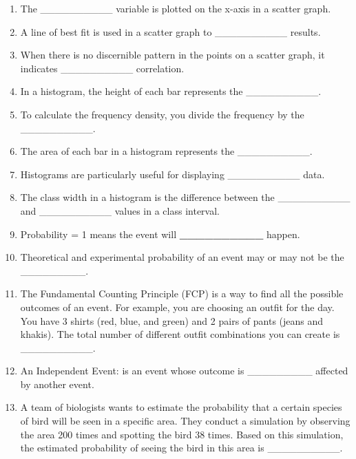 \documentclass{article}
\begin{document}
\begin{enumerate}
    \item The \_\_\_\_\_\_\_\_\_\_ variable is plotted on the x-axis in a scatter graph.
    \item A line of best fit is used in a scatter graph to \_\_\_\_\_\_\_\_\_\_ results.
    \item When there is no discernible pattern in the points on a scatter graph, it indicates \_\_\_\_\_\_\_\_\_\_ correlation.
    \item In a histogram, the height of each bar represents the \_\_\_\_\_\_\_\_\_\_.
    \item To calculate the frequency density, you divide the frequency by the \_\_\_\_\_\_\_\_\_\_.
    \item The area of each bar in a histogram represents the \_\_\_\_\_\_\_\_\_\_.
    \item Histograms are particularly useful for displaying \_\_\_\_\_\_\_\_\_\_ data.
    \item The class width in a histogram is the difference between the \_\_\_\_\_\_\_\_\_\_ and \_\_\_\_\_\_\_\_\_\_ values in a class interval.
    \item Probability = 1 means the event will \textbf{\_\_\_\_\_\_\_\_\_\_} happen.
    \item Theoretical and experimental probability of an event may or may not be the \_\_\_\_\_\_\_\_\_.
    \item The Fundamental Counting Principle (FCP) is a way to find all the possible outcomes of an event. For example, you are choosing an outfit for the day. You have 3 shirts (red, blue, and green) and 2 pairs of pants (jeans and khakis). The total number of different outfit combinations you can create is \_\_\_\_\_\_\_\_\_\_.
    \item An Independent Event: is an event whose outcome is \_\_\_\_\_\_\_\_\_ affected by another event.
    \item A team of biologists wants to estimate the probability that a certain species of bird will be seen in a specific area. They conduct a simulation by observing the area 200 times and spotting the bird 38 times. Based on this simulation, the estimated probability of seeing the bird in this area is \_\_\_\_\_\_\_\_\_\_.




\end{enumerate}
\end{document}
